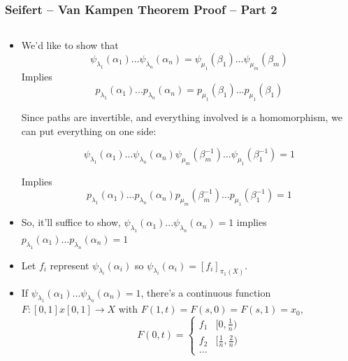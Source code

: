 \documentclass[8pt]{beamer}
\begin{document}
  \begin{frame}
    \frametitle{Seifert -- Van Kampen Theorem Proof -- Part 2}
    \begin{columns}
      \begin{column}[T]{0.5\textwidth}
        \begin{itemize}
          \item<1-> We'd like to show that
              \[\psi_{\lambda_1}(\alpha_1) ... \psi_{\lambda_n}
            (\alpha_n) = \psi_{\mu_1}(\beta_1) ... \psi_{\mu_m}(\beta_m)\]
            Implies
             \[p_{\lambda_1}(\alpha_1) ... p_{\lambda_n}(\alpha_n) =
              p_{\mu_1}(\beta_1) ... p_{\mu_1}(\beta_1) \]

            Since paths are invertible, and everything involved is a homomorphism,
            we can put everything on one side:

            \[\psi_{\lambda_1}(\alpha_1) ... \psi_{\lambda_n}(\alpha_n)
              \psi_{\mu_m}(\beta_m^{-1}) ... \psi_{\mu_1}(\beta_1^{-1}) = 1\]

            Implies
              \[p_{\lambda_1}(\alpha_1) ... p_{\lambda_n}(\alpha_n)
              p_{\mu_m}(\beta_m^{-1}) ... p_{\mu_1}(\beta_1^{-1}) = 1\]

          \item<2-> So, it'll suffice to show,
            $\psi_{\lambda_1}(\alpha_1) ... \psi_{\lambda_n}(\alpha_n) = 1$ implies
            $p_{\lambda_1}(\alpha_1) ... p_{\lambda_n}(\alpha_n) = 1$

          \item<3-> Let $f_i$ represent $\psi_{\lambda_i}(\alpha_i)$ so
            $\psi_{\lambda_i}(\alpha_i) = [f_i]_{\pi_1(X)}$.
          \item<4-> If $\psi_{\lambda_1}(\alpha_1) ... \psi_{\lambda_n}(\alpha_n) = 1$,
            there's a continuous function $F : [0,1]x[0,1] \rightarrow X$ with
            $F(1,t) = F(s,0) = F(s,1) = x_0$,
            \[F(0,t) = \begin{cases} f_1 & [0,\frac{1}{n}) \\ f_2 & [\frac{1}{n}, \frac{2}{n}) \\ ... \end{cases}\]


\end{itemize}
\end{column}
\end{columns}
\end{frame}
\end{document}
